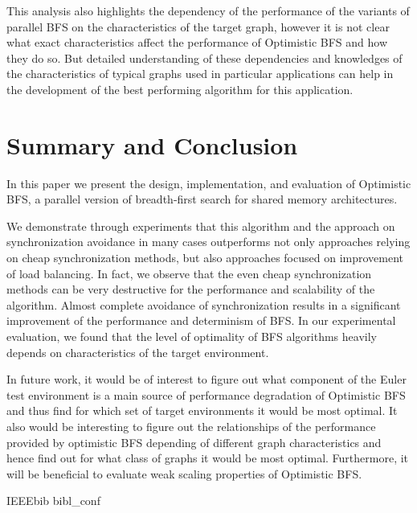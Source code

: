 \documentclass[letterpaper]{article}
\begin{document}
		This analysis also highlights the dependency of the performance of the variants of parallel BFS on the characteristics of the target graph, however it is not clear what exact characteristics affect the performance of Optimistic BFS and how they do so. 
		But detailed understanding of these dependencies and knowledges of the characteristics of typical graphs used in particular applications can help in the development of the best performing algorithm for this application.
		
		
		
	\section{Summary and Conclusion}\label{sec:suco} %
		In this paper we present the design, implementation, and evaluation of Optimistic BFS, a parallel version of breadth-first search for shared memory architectures.
		
		We demonstrate through experiments that this algorithm and the approach on synchronization avoidance in many cases outperforms not only approaches relying on cheap synchronization methods, but also approaches focused on improvement of load balancing. 		
		In fact, we observe that the even cheap synchronization methods can be very destructive for the performance and scalability of the algorithm.  
		Almost complete avoidance of synchronization results in a significant improvement of the performance and determinism of BFS. 
		In our experimental evaluation, we found that the level of optimality of BFS algorithms heavily depends on characteristics of the target environment. %
		
		In future work, it would be of interest to figure out what component of the Euler test environment is a main source of performance degradation of Optimistic BFS and thus find for which set of target environments it would be most optimal.  		
		It also would be interesting to figure out the relationships of the performance provided by optimistic BFS depending of different graph characteristics and hence find out for what class of graphs it would be most optimal.
		Furthermore, it will be beneficial to evaluate weak scaling properties of Optimistic BFS.
	
	 	{IEEEbib} %
	 		{bibl_conf}
\end{document}
